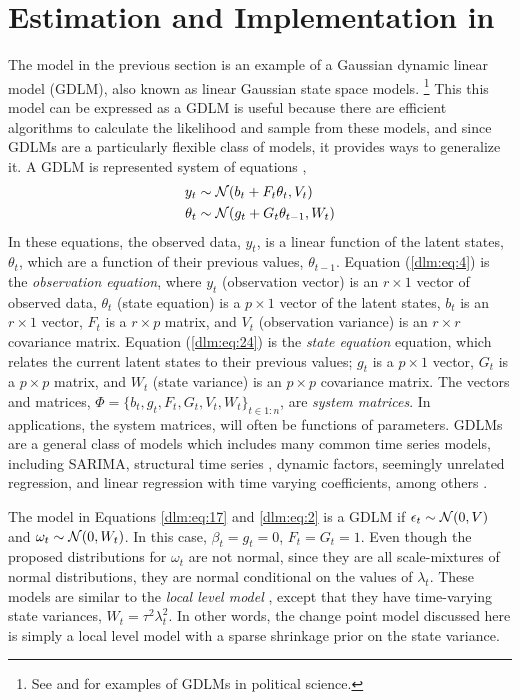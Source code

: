 \section{Estimation and Implementation in \Stan{}}
\label{dlm:sec:estimation}

The model in the previous section is an example of a Gaussian dynamic linear model (GDLM), also known as linear Gaussian state space models.%
\footnote{See \textcite{Beck1989} and \textcite{MartinQuinn2002} for examples of GDLMs in political science.}
This this model can be expressed as a GDLM is useful because there are efficient algorithms to calculate the likelihood and sample from these models, and since GDLMs are a particularly flexible class of models, it provides ways to generalize it.
A GDLM is represented system of equations \parencites{DurbinKoopman2012}{WestHarrison1997}{PetrisPetroneEtAl2009}[Ch 6]{ShumwayStoffer2010},
\begin{align}
  \label{dlm:eq:4}
  y_{t} &\sim \mathcal{N}\mathopen{}\left(b_{t} + F_{t} \theta_{t}, V_{t}\right)\mathclose{} \\
  \label{dlm:eq:24}
  \theta_{t} &\sim \mathcal{N}\mathopen{}\left(g_{t} + G_{t} \theta_{t - 1}, W_{t}\right)\mathclose{} 
\end{align}
In these equations, the observed data, $y_{t}$, is a linear function of the latent states, $\theta_{t}$, which are a function of their previous values, $\theta_{t-1}$.
Equation (\ref{dlm:eq:4}) is the \textit{observation equation}, where $y_{t}$ (observation vector) is an $r \times 1$ vector of observed data, $\theta_{t}$ (state equation) is a $p \times 1$ vector of the latent states, $b_{t}$ is an $r \times 1$ vector, $F_{t}$ is a $r \times p$ matrix, and $V_{t}$ (observation variance) is an $r \times r$ covariance matrix.
Equation (\ref{dlm:eq:24}) is the \textit{state equation} equation, which relates the current latent states to their previous values; $g_{t}$ is a $p \times 1$ vector, $G_{t}$ is a $p \times p$ matrix, and $W_{t}$ (state variance) is an $p \times p$ covariance matrix.
The vectors and matrices, $\Phi = \{ b_{t}, g_{t}, F_{t}, G_{t}, V_{t}, W_{t} \}_{t \in 1:n}$, are \textit{system matrices}.
In applications, the system matrices, will often be functions of parameters.
GDLMs are a general class of models which includes many common time series models, including SARIMA, structural time series \parencite{Harvey1990}, dynamic factors, seemingly unrelated regression, and linear regression with time varying coefficients, among others \parencite[Ch. 3]{DurbinKoopman2012}. 

The model in Equations \eqref{dlm:eq:17} and \eqref{dlm:eq:2} is a GDLM if $\epsilon_{t} \sim \mathcal{N}\mathopen{}\left(0, V\right)\mathclose{}$ and $\omega_{t} \sim \mathcal{N}\mathopen{}\left(0, W_{t}\right)\mathclose{}$.
In this case, $\beta_{t} = g_{t} = 0$, $F_{t} = G_{t} = 1$.
Even though the proposed distributions for $\omega_{t}$ are not normal, since they are all scale-mixtures of normal distributions, they are normal conditional on the values of $\lambda_{t}$.%
These models are similar to the \textit{local level model} \parencite[Ch 2.]{DurbinKoopman2012}, except that they have time-varying state variances, $W_{t} = \tau^2 \lambda^2_t$.
In other words, the change point model discussed here is simply a local level model with a sparse shrinkage prior on the state variance.

